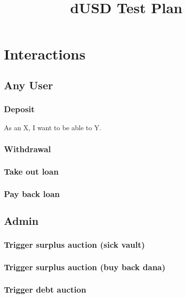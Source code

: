 \documentclass{article} %
\title{dUSD Test Plan}
\begin{document}
\maketitle


\section{Interactions}


\subsection{Any User}

\subsubsection{Deposit}

As an X, I want to be able to Y.

\subsubsection{Withdrawal}

\subsubsection{Take out loan}

\subsubsection{Pay back loan}


\subsection{Admin}

\subsubsection{Trigger surplus auction (sick vault)}

\subsubsection{Trigger surplus auction (buy back dana)}

\subsubsection{Trigger debt auction}
\end{document}
